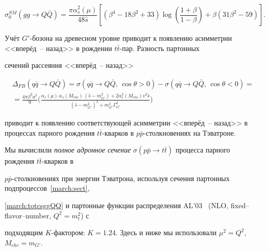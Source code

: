 \begin{equation}

\sigma^{SM}_0(gg\rightarrow Q \bar{Q}) {=} \frac{\pi  \alpha_s^2(\mu) }{48 \hat{s}} \left[ \left(\beta^4{-}18 \beta ^2+33\right)

\log \left(\frac{1{+}\beta }{1{-}\beta }\right){+} \beta  \left( 31 \beta ^2{-}59 \right) \right]. \label{march:totcsggQQ}

\end{equation}



Учёт $G'$-бозона на древесном уровне приводит к появлению асимметрии <<вперёд~-- назад>> в рождении $t\bar{t}$-пар. Разность партонных

сечений рассеяния <<вперёд~-- назад>>~\cite{Martynov:2010ed}

\begin{multline}

\Delta_{FB}(q\bar{q}\to Q\bar{Q}) =  \sigma(q\bar{q}\rightarrow Q \bar{Q},\, \cos \theta > 0)  - \sigma(q\bar{q}\rightarrow Q

\bar{Q}, \, \cos \theta < 0) =\\

 = \frac{4\pi \beta^2 a^2}{9}

\bigg( \frac{\alpha_s(\mu) \, \alpha_s(M_{chc}) \, (\hat{s}-m_{G'}^2) + 2 \alpha_s^2(M_{chc}) v^2 \hat{s}}

{(\hat{s}-m_{G'}^2)^2+m_{G'}^2 \Gamma_{G'}^2} \bigg) \label{march:eq:deltaFBqq}

\end{multline}

приводит к появлению соответствующей асимметрии <<вперёд~-- назад>> в процессах парного рождения $t \bar{t}$-кварков в $p\bar{p}$-столкновениях на Тэватроне.









Мы вычислили \textit{полное адронное сечение} $\sigma(p \bar{p} \rightarrow t \bar{t})$ процесса парного рождения $t\bar{t}$-кварков в

$p\bar{p}$-столкновениях при энергии Тэватрона, используя сечения партонных подпроцессов~\eqref{march:sect},

\eqref{march:totcsggQQ} и партонные функции распределения  AL'03~\cite{alekhin} (NLO, fixed--flavor--number,  $Q^2=m_t^2$) с

подходящим  $K$-фактором: $K=1.24$. Здесь и ниже мы использовали $\mu^2=Q^2$, $M_{chc}=m_{G'}$.



